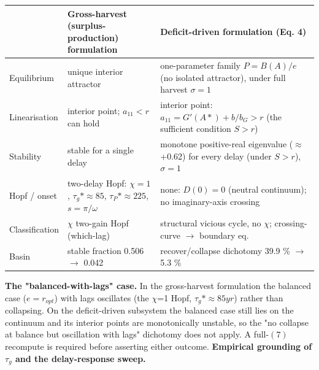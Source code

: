\documentclass[11pt]{article}
\begin{document}
\begin{table}[htbp]
\centering
\small
\begin{tabularx}{\textwidth}{l>{\raggedright\arraybackslash}X>{\raggedright\arraybackslash}X}
\toprule
 & Gross-harvest (surplus-production) formulation & Deficit-driven formulation (Eq. 4) \\
\midrule
Equilibrium & unique interior attractor & one-parameter family $P = B(A)/e$ (no isolated attractor), under full harvest $\sigma{} = 1$ \\
Linearisation & interior point; $a_{11} < r$ can hold & interior point: $a_{11} = G'(A*) + b/b_{G} > r$ (the sufficient condition $S > r$) \\
Stability & stable for a single delay & monotone positive-real eigenvalue (\ensuremath{\approx{}} +0.62) for every delay (under $S > r$), $\sigma{} = 1$ \\
Hopf / onset & two-delay Hopf: $\chi{}=1$, $\tau{}_{g}*\approx{}85$, $\tau{}_{P}*\approx{}225$, $s=\pi{}/\omega{}$ & none: $D(0)=0$ (neutral continuum); no imaginary-axis crossing \\
Classification & $\chi{}$ two-gain Hopf (which-lag) & structural vicious cycle, no $\chi{}$; crossing-curve \ensuremath{\to{}} boundary eq. \\
Basin & stable fraction 0.506 \ensuremath{\to{}} 0.042 & recover/collapse dichotomy 39.9 \% \ensuremath{\to{}} 5.3 \% \\
\bottomrule
\end{tabularx}
\end{table}

\textbf{The "balanced-with-lags" case.} In the gross-harvest formulation the balanced case ($e = r_{opt}$) with lags oscillates (the \ensuremath{\chi{}}=1 Hopf, $\tau{}_{g}* \approx{} 85 yr$) rather than collapsing. On the deficit-driven subsystem the balanced case still lies on the continuum and its interior points are monotonically unstable, so the "no collapse at balance but oscillation with lags" dichotomy does not apply. A full-$(7)$ recompute is required before asserting either outcome. \textbf{Empirical grounding of $\tau{}_{g}$ and the delay-response sweep.}
\end{document}
